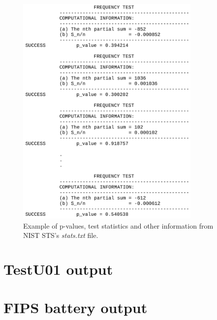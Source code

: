 \documentclass[
  digital,     %
  oneside,     %
  nosansbold,  %
  nocolorbold, %
  nolof,         %
  nolot,         %
]{fithesis4}
\begin{document}
\pagebreak

\begin{figure}[H]
  \begin{center}
    \includegraphics[width=9cm]{figures/outputs-appendix/stats.jpg}
  \end{center}
  \caption{Example of p-values, test statistics and other information from NIST STS's \emph{stats.txt} file.}
  \label{fig:nist_stats}
\end{figure}

\pagebreak

\section{TestU01 output} \label{append:tu01-output}

\pagebreak

\section{FIPS battery output} \label{append:fips-output}
\end{document}
